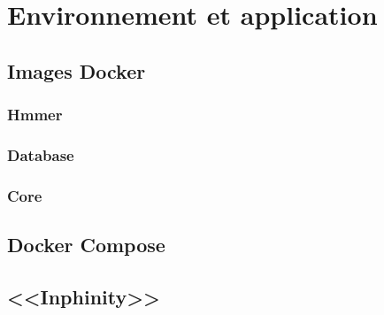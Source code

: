 \chapter{Environnement et application}
\label{ch:app}

\section{Images Docker}
\subsection{Hmmer}
\subsection{Database}
\subsection{Core}

\section{Docker Compose}

\section{<<Inphinity>>}

